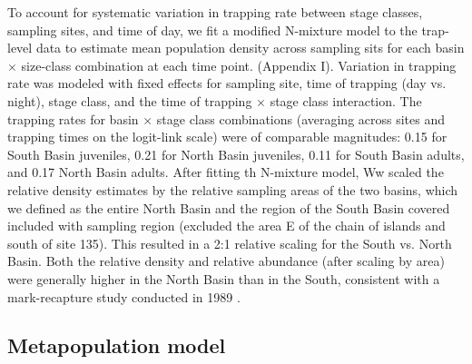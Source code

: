\documentclass[11pt]{article}
\begin{document}
To account for systematic variation in trapping rate between stage classes,
sampling sites, and time of day, 
we fit a modified N-mixture model \citep{royle2004}
to the trap-level data to estimate mean population density across sampling sits 
for each basin $\times$ size-class combination at each time point.
(Appendix I). 
Variation in trapping rate was modeled with fixed effects for 
sampling site,
time of trapping (day vs. night),
stage class,
and the time of trapping $\times$ stage class interaction.
The trapping rates for basin $\times$ stage class combinations
(averaging across sites and trapping times on the logit-link scale) 
were of comparable magnitudes:
0.15 for South Basin juveniles,
0.21 for North Basin juveniles,
0.11 for South Basin adults, 
and 0.17 North Basin adults.
After fitting th N-mixture model,
Ww scaled the relative density estimates by the relative sampling areas of the two basins, 
which we defined as the entire North Basin and the region of the South Basin 
covered included with sampling region 
(excluded the area E of the chain of islands and south of site 135).
This resulted in a 2:1 relative scaling for the South vs. North Basin.
Both the relative density and relative abundance (after scaling by area)
were generally higher in the North Basin than in the South,
consistent with a mark-recapture study conducted in 1989 \citep{gislason1998}.





\subsection*{Metapopulation model} 
\end{document}
